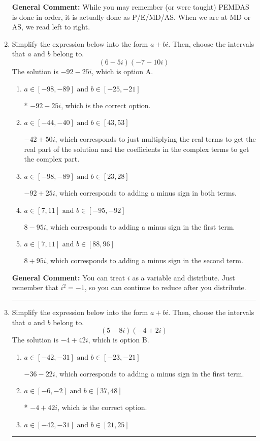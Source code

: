 \documentclass{extbook}[14pt]
\newcommand{\litem}[1]{\item #1

\rule{\textwidth}{0.4pt}}
\begin{document}
\begin{enumerate}
{\textbf{General Comment:} While you may remember (or were taught) PEMDAS is done in order, it is actually done as P/E/MD/AS. When we are at MD or AS, we read left to right.
}
\litem{
Simplify the expression below into the form $a+bi$. Then, choose the intervals that $a$ and $b$ belong to.
\[ (6 - 5 i)(-7 - 10 i) \]The solution is \( -92 - 25 i \), which is option A.\begin{enumerate}[label=\Alph*.]
\item \( a \in [-98, -89] \text{ and } b \in [-25, -21] \)

* $-92 - 25 i$, which is the correct option.
\item \( a \in [-44, -40] \text{ and } b \in [43, 53] \)

 $-42 + 50 i$, which corresponds to just multiplying the real terms to get the real part of the solution and the coefficients in the complex terms to get the complex part.
\item \( a \in [-98, -89] \text{ and } b \in [23, 28] \)

 $-92 + 25 i$, which corresponds to adding a minus sign in both terms.
\item \( a \in [7, 11] \text{ and } b \in [-95, -92] \)

 $8 - 95 i$, which corresponds to adding a minus sign in the first term.
\item \( a \in [7, 11] \text{ and } b \in [88, 96] \)

 $8 + 95 i$, which corresponds to adding a minus sign in the second term.
\end{enumerate}

\textbf{General Comment:} You can treat $i$ as a variable and distribute. Just remember that $i^2=-1$, so you can continue to reduce after you distribute.
}
\litem{
Simplify the expression below into the form $a+bi$. Then, choose the intervals that $a$ and $b$ belong to.
\[ (5 - 8 i)(-4 + 2 i) \]The solution is \( -4 + 42 i \), which is option B.\begin{enumerate}[label=\Alph*.]
\item \( a \in [-42, -31] \text{ and } b \in [-23, -21] \)

 $-36 - 22 i$, which corresponds to adding a minus sign in the first term.
\item \( a \in [-6, -2] \text{ and } b \in [37, 48] \)

* $-4 + 42 i$, which is the correct option.
\item \( a \in [-42, -31] \text{ and } b \in [21, 25] \)


\end{enumerate}}
\end{enumerate}
\end{document}
